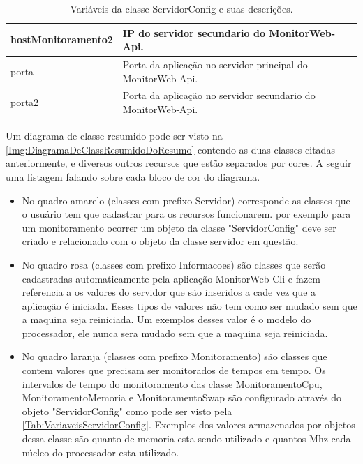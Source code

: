 \begin{table}[!ht]
\begin{tabular}{|l|l|}
hostMonitoramento2                     & \multicolumn{1}{p{10.00cm}|}{IP do servidor secundario do MonitorWeb-Api.} \\ \hline
porta                                  & \multicolumn{1}{p{10.00cm}|}{Porta da aplicação no servidor principal do MonitorWeb-Api.} \\ \hline
porta2                                 & \multicolumn{1}{p{10.00cm}|}{Porta da aplicação no servidor secundario do MonitorWeb-Api.} \\ \hline
\end{tabular}
\caption[Variáveis da classe ServidorConfig e suas descrições.]{Variáveis da classe ServidorConfig e suas descrições.}
\label{Tab:VariaveisServidorConfig}
\end{table}

Um diagrama de classe resumido pode ser visto na \autoref{Img:DiagramaDeClassResumidoDoResumo} contendo as duas classes citadas anteriormente, e diversos outros recursos que estão separados por cores. A seguir uma listagem falando sobre cada bloco de cor do diagrama. 


\begin{itemize}
		\item No quadro amarelo (classes com prefixo Servidor) corresponde as classes que o usuário tem que cadastrar para os recursos funcionarem.
		por exemplo para um monitoramento ocorrer um objeto da classe "ServidorConfig" deve ser criado e relacionado com o objeto da classe servidor em questão.
		\item No quadro rosa (classes com prefixo Informacoes) são classes que serão cadastradas automaticamente pela aplicação MonitorWeb-Cli e fazem referencia a os valores do servidor que são inseridos a cade vez que a aplicação é iniciada. Esses tipos de valores não tem como ser mudado sem que a maquina seja reiniciada. Um exemplos desses valor é o modelo do processador, ele nunca sera mudado sem que a maquina seja reiniciada.
		\item No quadro laranja (classes com prefixo Monitoramento) são classes que contem valores que precisam ser monitorados de tempos em tempo. Os intervalos de tempo do monitoramento das classe MonitoramentoCpu, MonitoramentoMemoria e MonitoramentoSwap são configurado através do objeto "ServidorConfig" como pode ser visto pela \autoref{Tab:VariaveisServidorConfig}. Exemplos dos valores armazenados por objetos dessa classe são quanto de memoria esta sendo utilizado e quantos Mhz cada núcleo do processador esta utilizado.
\end{itemize}



